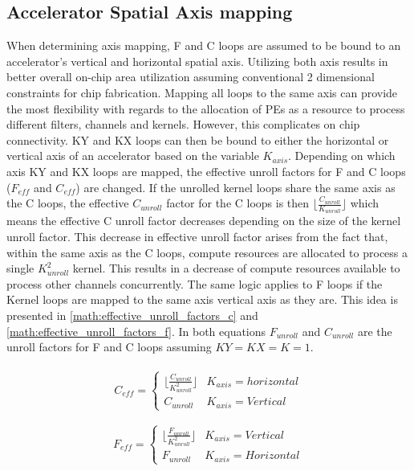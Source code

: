 \subsection{Accelerator Spatial Axis mapping}
\label{chap:dda:dataflow_dse:indirect_mode:axis_mapping}

When determining axis mapping, F and C loops are assumed to be bound to an
accelerator's vertical and horizontal spatial axis. Utilizing both axis results
in better overall on-chip area utilization assuming conventional 2 dimensional
constraints for chip fabrication. Mapping all loops to the same axis can provide
the most flexibility with regards to the allocation of PEs as a resource to
process different filters, channels and kernels. However, this complicates on
chip connectivity. KY and KX loops can then be
bound to either the horizontal or vertical axis of an accelerator based on the
variable $K_{axis}$.  Depending on which axis KY and KX loops are mapped, the
effective unroll factors for F and C loops ($F_{eff}$ and $C_{eff}$) are
changed. If the unrolled kernel loops share the same axis as the C loops, the
effective $C_{unroll}$ factor for the C loops is then $\lfloor
\frac{C_{unroll}}{K_{unroll}} \rfloor$ which means the effective C unroll factor
decreases depending on the size of the kernel unroll factor. This decrease in
effective unroll factor arises from the fact that, within the same axis as the C
loops, compute resources are allocated to process a single $K^2_{unroll}$ kernel. This
results in a decrease of compute resources available to process other channels
concurrently. The same logic applies to F loops if the Kernel loops are mapped
to the same axis vertical axis as they are. This idea is presented in
\autoref{math:effective_unroll_factors_c} and
\autoref{math:effective_unroll_factors_f}. In both equations $F_{unroll}$ and
$C_{unroll}$ are the unroll factors for F and C loops assuming $KY=KX=K=1$.


\begin{align}
    \begin{gathered}
        C_{eff} = \begin{cases} \lfloor \frac{C_{unroll}}{K^{2}_{unroll}} \rfloor & K_{axis} = horizontal\\ C_{unroll} & K_{axis} = Vertical\end{cases} \\
        \end{gathered}
    \label{math:effective_unroll_factors_c}
\end{align}
\begin{align}
    \begin{gathered}
        F_{eff} = \begin{cases} \lfloor \frac{F_{unroll}}{K^{2}_{unroll}} \rfloor & K_{axis} = Vertical\\ F_{unroll} & K_{axis} = Horizontal\end{cases} \\
        \end{gathered}
    \label{math:effective_unroll_factors_f}
\end{align}

